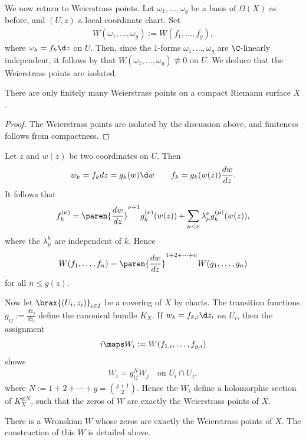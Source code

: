 \documentclass[11pt]{report}
\begin{document}
We now return to Weierstrass points. Let $\omega_1,\dots,\omega_g$ be a basis of $\Omega (X)$ as before, and $(U,z)$ a local coordinate chart. Set
\begin{align*}
W(\omega_1,\dots,\omega_g):=W(f_1,\dots,f_g),
\end{align*} 
where $\omega_k = f_k\d z$ on $U$. Then, since the 1-forms $\omega_1,\dots,\omega_g$ are $\C$-linearly independent, it follows by  that $W(\omega_1,\dots,\omega_g) \not \equiv 0$ on $U$. We deduce that the Weierstrass points are isolated.
\begin{prop}
There are only finitely many Weierstrass points on a compact Riemann surface $X$.
\end{prop}
\begin{proof}
The Weierstrass points are isolated by the discussion above, and finiteness follows from compactness.
\end{proof}

Let $z$ and $w(z)$ be two coordinates on $U$. Then
\begin{align*}
w_k=f_kdz = g_k(w)\d w\qquad f_k = g_k(w(z))\frac{dw}{dz}.
\end{align*}
It follows that
\begin{align*}
f_k^{(\nu)} = \paren{\frac{dw}{dz}}^{\nu+1}g_k^{(\nu)}(w(z))+ \sum_{\mu < \nu} \lambda_\mu^\nu g_k^{(\mu)}(w(z)),
\end{align*}
where the $\lambda_\mu^k$ are independent of $k$. Hence
\begin{align*}
W(f_1,\dots,f_n)=\paren{\frac{dw}{dz}}^{1+2+\cdots + n}W(g_1,\dots,g_n)
\end{align*}
for all $n \leq g(z)$.

Now let $\brax{(U_i,z_i)}_{i \in I}$ be a covering of $X$ by charts. The transition functions $g_{ij}:= \frac{dz_j}{dz_i}$ define the canonical bundle $K_X$. If $w_k = f_{k,i}\d z_i$ on $U_i$, then the assignment
\begin{align*}
i \maps W_i := W(f_{1,i},\dots,f_{g,i})
\end{align*}
shows
\begin{align*}
W_i = g_{ij}^NW_j \quad \text{on } U_i \cap U_j,
\end{align*}
where $N:=1+2+\cdots + g = \binom{g+1}{2}$. Hence the $W_i$ define a holomorphic section of $K_X^{\otimes N}$, such that the zeros of $W$ are exactly the Weierstrass points of $X$.

\begin{thm}
There is a Wronskian $W$ whose zeros are exactly the Weierstrass points of $X$. The construction of this $W$ is detailed above.
\end{thm}
\end{document}
